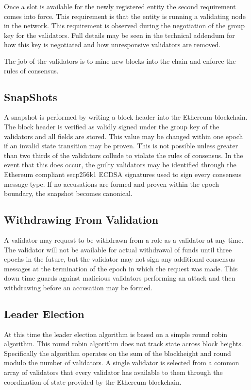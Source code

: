 Once a slot is available for the newly registered entity the second
requirement comes into force.
This requirement is that the entity is running a validating node in the
network.
This requirement is observed during the negotiation of the group key
for the validators.
Full details may be seen in the technical addendum for how this key is
negotiated and how unresponsive validators are removed.

The job of the validators is to mine new blocks into the chain and
enforce the rules of consensus.


\subsection{SnapShots}

A snapshot is performed by writing a block header into the Ethereum
blockchain.
The block header is verified as validly signed under the group key of
the validators and all fields are stored.
This value may be changed within one epoch if an invalid state
transition may be proven.
This is not possible unless greater than two thirds of the validators
collude to violate the rules of consensus.
In the event that this does occur, the guilty validators may be
identified through the Ethereum compliant secp256k1 ECDSA signatures
used to sign every consensus message type.
If no accusations are formed and proven within the epoch boundary, the
snapshot becomes canonical.


\subsection{Withdrawing From Validation}

A validator may request to be withdrawn from a role as a validator at
any time.
The validator will not be available for actual withdrawal of funds
until three epochs in the future, but the validator may not sign any
additional consensus messages at the termination of the epoch in which
the request was made.
This down time guards against malicious validators performing an attack
and then withdrawing before an accusation may be formed.


\subsection{Leader Election}

At this time the leader election algorithm is based on a simple round
robin algorithm.
This round robin algorithm does not track state across block heights.
Specifically the algorithm operates on the sum of the blockheight and
round modulo the number of validators.
A single validator is selected from a common array of validators that
every validator has available to them through the coordination of state
provided by the Ethereum blockchain.


